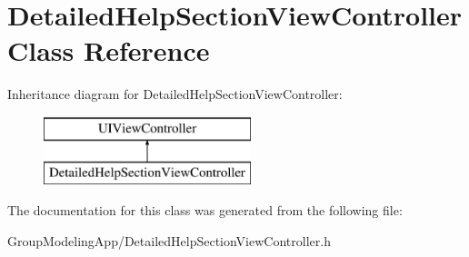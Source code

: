 \hypertarget{interface_detailed_help_section_view_controller}{\section{Detailed\-Help\-Section\-View\-Controller Class Reference}
\label{interface_detailed_help_section_view_controller}
}
Inheritance diagram for Detailed\-Help\-Section\-View\-Controller\-:\begin{figure}[H]
\begin{center}
\leavevmode
\includegraphics[height=2.000000cm]{interface_detailed_help_section_view_controller}
\end{center}
\end{figure}


The documentation for this class was generated from the following file\-:\begin{DoxyCompactItemize}
\item 
Group\-Modeling\-App/Detailed\-Help\-Section\-View\-Controller.\-h\end{DoxyCompactItemize}
